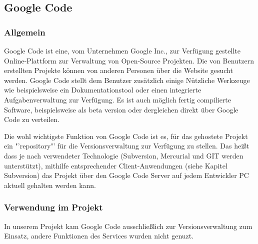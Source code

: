 \subsection{Google Code}
\subsubsection{Allgemein}
Google Code ist eine, vom Unternehmen Google Inc., zur Verfügung gestellte Online-Plattform zur Verwaltung von Open-Source Projekten. Die von Benutzern erstellten Projekte können von anderen Personen über die Website gesucht werden. 
Google Code stellt dem Benutzer zusätzlich einige Nützliche Werkzeuge wie beispielsweise ein Dokumentationstool oder einen integrierte Aufgabenverwaltung zur Verfügung. Es ist auch möglich fertig compilierte Software, beispielsweise als beta version oder dergleichen direkt über Google Code zu verteilen. 

Die wohl wichtigste Funktion von Google Code ist es, für das gehostete Projekt ein "'repository"' für die Versionsverwaltung zur Verfügung zu stellen. Das heißt dass je nach verwendeter Technologie (Subversion, Mercurial und GIT werden unterstützt), mithilfe entsprechender Client-Anwendungen (siehe Kapitel Subversion) das Projekt über den Google Code Server auf jedem Entwickler PC aktuell gehalten werden kann.

\subsubsection{Verwendung im Projekt}
In unserem Projekt kam Google Code ausschließlich zur Versionsverwaltung zum Einsatz, andere Funktionen des Services wurden nicht genuzt. 

